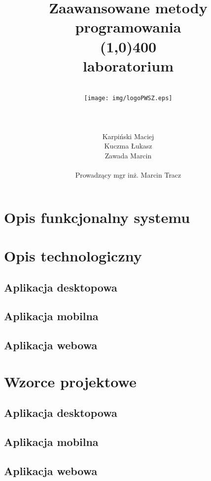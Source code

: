 \documentclass[12pt,a4paper]{article}
\author{
	\\\texttt{[image: img/logoPWSZ.eps]} \\\\\\\\
	\hfill Karpiński Maciej\\
	\hfill Kuczma Łukasz\\
	\hfill Zawada Marcin\\\\
	\hfill Prowadzący mgr inż. Marcin Tracz
	}
\title{\textbf{Zaawansowane metody programowania}\\\line(1,0){400}\\\textbf{laboratorium}}
\date{}
\begin{document}
	\maketitle
	\thispagestyle{fancy}
	\fancyhf{}
	\rhead{\textcolor{gray}{\footnotesize Państwowa Wyższa Szkoła Zawodowa im. Witelona w Legnicy\\Informatyka, rok III\\Semestr letni 2020/2021}}	
	\renewcommand{\headrulewidth}{0pt}
	\clearpage

	\pagestyle{fancy}
	\rfoot{\thepage}	
	\tableofcontents
	\newpage

	\section{Opis funkcjonalny systemu}	
	\newpage
	
	\section{Opis technologiczny}
		\subsection{Aplikacja desktopowa}
		\subsection{Aplikacja mobilna}
		\subsection{Aplikacja webowa}
	\newpage
	
	\section{Wzorce projektowe}
		\subsection{Aplikacja desktopowa}
		\subsection{Aplikacja mobilna}
		\subsection{Aplikacja webowa}	 
	\newpage
	
\end{document}
